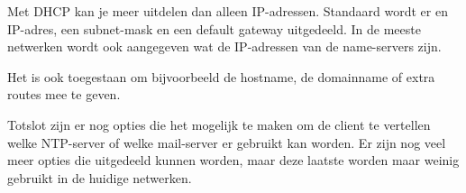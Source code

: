 Met DHCP kan je meer uitdelen dan alleen IP-adressen. Standaard wordt er en IP-adres, een subnet-mask en een default gateway uitgedeeld. In de meeste netwerken wordt ook aangegeven wat de IP-adressen van de name-servers zijn.

Het is ook toegestaan om bijvoorbeeld de hostname, de domainname of extra routes mee te geven.

Totslot zijn er nog opties die het mogelijk te maken om de client te vertellen welke NTP-server of welke mail-server er gebruikt kan worden. Er zijn nog veel meer opties die uitgedeeld kunnen worden, maar deze laatste worden maar weinig gebruikt in de huidige netwerken.

